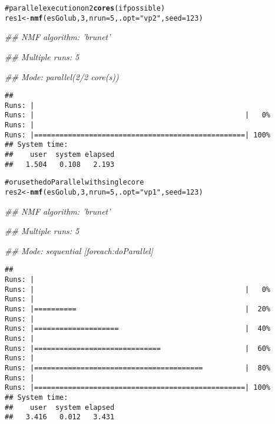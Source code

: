 \documentclass[a4paper]{article}\usepackage{graphicx, color}
\makeatletter
\newcommand{\hlfunctioncall}[1]{\textcolor[rgb]{0.501960784313725,0,0.329411764705882}{\textbf{#1}}}%
\newcommand{\hlstring}[1]{\textcolor[rgb]{0.6,0.6,1}{#1}}%
\newcommand{\hlcomment}[1]{\textcolor[rgb]{0.180392156862745,0.6,0.341176470588235}{#1}}%
\newenvironment{kframe}{%
 \def\at@end@of@kframe{}%
 \ifinner\ifhmode%
  \def\at@end@of@kframe{\end{minipage}}%
  \begin{minipage}{\columnwidth}%
 \fi\fi%
 \def\FrameCommand##1{\hskip\@totalleftmargin \hskip-\fboxsep
 \colorbox{shadecolor}{##1}\hskip-\fboxsep
     \hskip-\linewidth \hskip-\@totalleftmargin \hskip\columnwidth}%
 \MakeFramed {\advance\hsize-\width
   \@totalleftmargin\z@ \linewidth\hsize
   \@setminipage}}%
 {\par\unskip\endMakeFramed%
 \at@end@of@kframe}
\newenvironment{knitrout}{}{} %
\makeatother
\begin{document}
\begin{knitrout}
\color{fgcolor}\begin{kframe}
\begin{alltt}
\hlcomment{# parallel execution on 2 \hlfunctioncall{cores} (if possible)}
res1 <- \hlfunctioncall{nmf}(esGolub, 3, nrun = 5, .opt = \hlstring{"vp2"}, seed = 123)
\end{alltt}


{\ttfamily\noindent\itshape\textcolor{messagecolor}{\#\# NMF algorithm: 'brunet'}}

{\ttfamily\noindent\itshape\textcolor{messagecolor}{\#\# Multiple runs: 5}}

{\ttfamily\noindent\itshape\textcolor{messagecolor}{\#\# Mode: parallel(2/2 core(s))}}\begin{verbatim}
## 
Runs: |                                                        
Runs: |                                                  |   0%
Runs: |                                                        
Runs: |==================================================| 100%
## System time:
##    user  system elapsed 
##   1.504   0.108   2.193
\end{verbatim}
\begin{alltt}

\hlcomment{# or use the doParallel with single core}
res2 <- \hlfunctioncall{nmf}(esGolub, 3, nrun = 5, .opt = \hlstring{"vp1"}, seed = 123)
\end{alltt}


{\ttfamily\noindent\itshape\textcolor{messagecolor}{\#\# NMF algorithm: 'brunet'}}

{\ttfamily\noindent\itshape\textcolor{messagecolor}{\#\# Multiple runs: 5}}

{\ttfamily\noindent\itshape\textcolor{messagecolor}{\#\# Mode: sequential [foreach:doParallel]}}\begin{verbatim}
## 
Runs: |                                                        
Runs: |                                                  |   0%
Runs: |                                                        
Runs: |==========                                        |  20%
Runs: |                                                        
Runs: |====================                              |  40%
Runs: |                                                        
Runs: |==============================                    |  60%
Runs: |                                                        
Runs: |========================================          |  80%
Runs: |                                                        
Runs: |==================================================| 100%
## System time:
##    user  system elapsed 
##   3.416   0.012   3.431
\end{verbatim}
\begin{alltt}


\end{alltt}
\end{kframe}
\end{knitrout}
\end{document}
